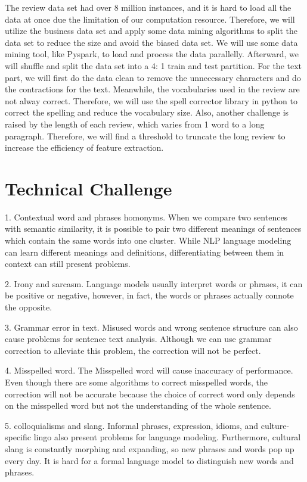 \documentclass[11pt]{article}
\begin{document}
The review data set had over 8 million instances, and it is hard to load all the data at once due the limitation of our computation resource. Therefore, we will utilize the business data set and apply some data mining algorithms to split the data set to reduce the size and avoid the biased data set. We will use some data mining tool, like Pyspark, to load and process the data parallelly. Afterward, we will shuffle and split the data set into a 4: 1 train and test partition. For the text part, we will first do the data clean to remove the unnecessary characters and do the contractions for the text. Meanwhile, the vocabularies used in the review are not alway correct. Therefore, we will use the spell corrector library in python to correct the spelling and reduce the vocabulary size. Also, another challenge is raised by the length of each review, which varies from 1 word to a long paragraph. Therefore, we will find a threshold to truncate the long review to increase the efficiency of feature extraction.


\section{Technical Challenge}

1. Contextual word and phrases homonyms. When we compare two sentences with semantic similarity, it is possible to pair two different meanings of sentences which contain the same words into one cluster. While NLP language modeling can learn different meanings and definitions, differentiating between them in context can still present problems.

2. Irony and sarcasm. Language models usually interpret words or phrases, it can be positive or negative, however, in fact, the words or phrases actually connote the opposite.

3. Grammar error in text. Misused words and wrong sentence structure can also cause problems for sentence text analysis. Although we can use grammar correction to alleviate this problem, the correction will not be perfect.

4. Misspelled word. The Misspelled word will cause inaccuracy of performance. Even though there are some algorithms to correct misspelled words, the correction will not be accurate because the choice of correct word only depends on the misspelled word but not the understanding of the whole sentence.

5. colloquialisms and slang. Informal phrases, expression, idioms, and culture-specific lingo also present problems for language modeling. Furthermore, cultural slang is constantly morphing and expanding, so new phrases and words pop up every day. It is hard for a formal language model to distinguish new words and phrases.
\end{document}
